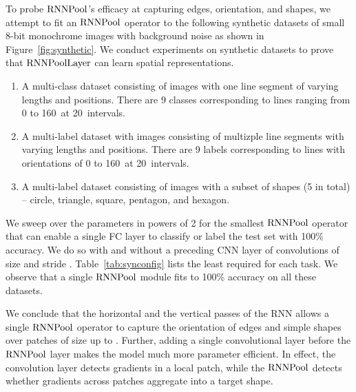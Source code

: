 \documentclass[10pt]{article}
\newcommand{\rpool}{\ensuremath{{\rm RNNPool}}\xspace}
\newcommand{\rpoollayer}{\ensuremath{{\rm RNNPoolLayer}}\xspace}
\begin{document}
To probe \rpool's efficacy at capturing edges, orientation, and
shapes, we attempt to fit an \rpool operator to the following
synthetic datasets of small 8-bit monochrome images with background
noise as shown in Figure~\ref{fig:synthetic}.  We conduct experiments
on synthetic datasets to prove that \rpoollayer can learn spatial
representations. 
\begin{enumerate}[leftmargin=*]
  \item A multi-class dataset consisting of images with one line
    segment of varying lengths and positions. There are 9 classes
    corresponding to lines ranging from 0 to 160\textdegree~at
    20\textdegree~intervals.
  \item A multi-label dataset with images consisting of multizple line
    segments with varying lengths and positions. There are 9 labels
    corresponding to lines with orientations of 0 to 160\textdegree~at
    20\textdegree~intervals.
  \item A multi-label dataset consisting of images with a subset of
    shapes (5 in total) -- circle, triangle, square, pentagon, and
    hexagon.
\end{enumerate}


\begin{wraptable}{r}{0.5\columnwidth}
\vspace{-5mm}
\centering
    \caption{\small Minimum required hyperparameter configurations for synthetic experiments.}
\label{tab:synconfig}
\vspace{-3mm}
\end{wraptable}  We sweep over the 
parameters in powers of 2 for the smallest \rpool operator that can
enable a single FC layer to classify or label the test set with 100\%
accuracy. We do so with and without a preceding CNN layer of 
convolutions of  size and stride
. Table~\ref{tab:synconfig} lists the least  required for
each task.  We observe that a single \rpool module fits to 100\%
accuracy on all these datasets.

We conclude that the horizontal and the vertical passes of the RNN
allows a single \rpool operator to capture the orientation of edges
and simple shapes over patches of size up to .  Further,
adding a single convolutional layer before the \rpool layer makes the
model much more parameter efficient. In effect, the convolution layer
detects gradients in a local  patch, while the \rpool
detects whether gradients across  patches aggregate into a
target shape.
\end{document}
